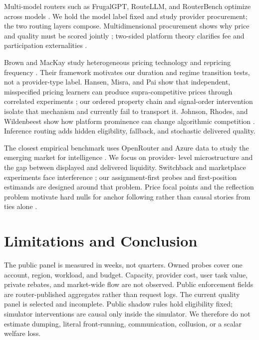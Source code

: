 \documentclass[sigconf,nonacm]{acmart}
\newcommand{\1}{\mathbf 1}
\begin{document}
Multi-model routers such as FrugalGPT, RouteLLM, and RouterBench optimize across
models \cite{chen2023frugalgpt,ong2024routellm,hu2024routerbench}.  We hold the
model label fixed and study provider procurement; the two routing layers compose.
Multidimensional procurement shows why price and quality must be scored jointly
\cite{che1993}; two-sided platform theory clarifies fee and participation
externalities \cite{rochettirole2003}.

Brown and MacKay study heterogeneous pricing technology and repricing frequency
\cite{brownmackay2023}.  Their framework motivates our duration and regime
transition tests, not a provider-type label.  Hansen, Misra, and Pai show that
independent, misspecified pricing learners can produce supra-competitive prices
through correlated experiments \cite{hansenmisrapai2021}; our ordered property
chain and signal-order intervention isolate that mechanism and currently fail to
transport it.  Johnson, Rhodes, and Wildenbeest show how platform prominence can
change algorithmic competition \cite{johnsonrhodeswildenbeest2023}.  Inference
routing adds hidden eligibility, fallback, and stochastic delivered quality.

The closest empirical benchmark uses OpenRouter and Azure data to study the
emerging market for intelligence \cite{demireretal2025}.  We focus on provider-
level microstructure and the gap between displayed and delivered liquidity.
Switchback and marketplace experiments face interference
\cite{bojinov2023,holtz2025}; our assignment-first probes and first-position
estimands are designed around that problem.  Price focal points and the reflection
problem motivate hard nulls for anchor following rather than causal stories from
ties alone \cite{knittelstango2003,manski1993}.

\section{Limitations and Conclusion}

The public panel is measured in weeks, not quarters.  Owned probes cover one
account, region, workload, and budget.  Capacity, provider cost, user task value,
private rebates, and market-wide flow are not observed.  Public enforcement
fields are router-published aggregates rather than request logs.  The current
quality panel is selected and incomplete.  Public shadow rules hold eligibility
fixed; simulator interventions are causal only inside the simulator.  We therefore do
not estimate dumping, literal front-running, communication, collusion, or a scalar
welfare loss.
\end{document}
